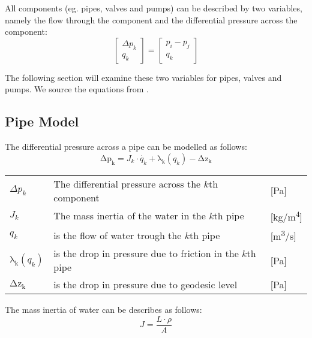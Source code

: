 All components (eg. pipes, valves and pumps) can be described by two variables, namely the flow through the component and the differential pressure across the component:
\begin{equation}
\begin{bmatrix} \Delta{p_{k}} \\ q_{k} \end{bmatrix} = 
\begin{bmatrix} p_{i} - p_{j} \\ q_{k} \end{bmatrix}    
\end{equation}

The following section will examine these two variables for pipes, valves and pumps. We source the equations from \cite{MathiasBjarni2015}.

\subsection{Pipe Model}\label{subsec:PipeModel}
The differential pressure across a pipe can be modelled as follows:
\begin{equation}
    \mathrm{\Delta{p_{k}}} = J_{k}\cdot\dot{q_{k}}+\mathrm{\lambda_{k}}(q_{k})-\mathrm{\Delta{z_{k}}}
    \label{eq:Delta_p_pipe}
\end{equation}


	\begin{center}
		\begin{tabular}{l p{10cm} l}
			
			$\Delta{p_{k}}$ & The differential pressure across the $k$th component & [\si{Pa}]\\ 
		  	${J_{k}}$ & The mass inertia of the water in the $k$th pipe & [\si{kg}/\si{m^{4}}] \\
		  	$q_{k}$ & is the flow of water trough the $k$th pipe & [{\si{\meter\cubed}/\si{s}}] \\
		  	$\mathrm{\lambda_{k}}(q_{k})$ & is the drop in pressure due to friction in the $k$th pipe & [\si{Pa}] \\
		  	$\mathrm{\Delta{z_{k}}}$ & is the drop in pressure due to geodesic level & [\si{Pa}]\\
			\end{tabular}
	\end{center}

The mass inertia of water can be describes as follows:
\begin{equation}
	J= \frac{L\cdot \rho}{A}
\end{equation}


